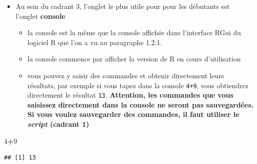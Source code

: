 \documentclass[
]{book}
\newenvironment{Shaded}{\begin{snugshade}}{\end{snugshade}}
\newcommand{\DecValTok}[1]{\textcolor[rgb]{0.00,0.00,0.81}{#1}}
\newcommand{\SpecialCharTok}[1]{\textcolor[rgb]{0.81,0.36,0.00}{\textbf{#1}}}
\providecommand{\tightlist}{%
  \setlength{\itemsep}{0pt}\setlength{\parskip}{0pt}}
\begin{document}
\begin{itemize}
\tightlist
\item
  Au sein du cadrant 3, l'onglet le plus utile pour pour les débutants est l'onglet \textbf{console}

  \begin{itemize}
  \tightlist
  \item
    la console est la même que la console affichée dans l'interface RGui du logiciel R que l'on a vu au paragraphe 1.2.1.
  \item
    la console commence par afficher la version de R en cours d'utilisation
  \item
    vous pouvez y saisir des commandes et obtenir directement leurs résultats, par exemple si vous tapez dans la console \texttt{4+9}, vous obtiendrez directement le résultat \texttt{13}. \textbf{Attention, les commandes que vous saisissez directement dans la console ne seront pas sauvegardées. Si vous voulez sauvegarder des commandes, il faut utiliser le \emph{script} (cadrant 1)}
  \end{itemize}
\end{itemize}

\begin{Shaded}
\begin{Highlighting}[]
\DecValTok{4}\SpecialCharTok{+}\DecValTok{9}
\end{Highlighting}
\end{Shaded}

\begin{verbatim}
## [1] 13
\end{verbatim}
\end{document}
